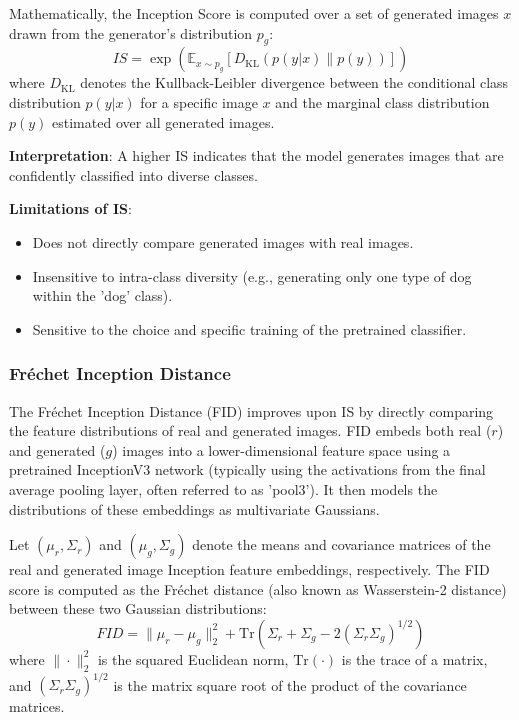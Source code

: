 \noindent
Mathematically, the Inception Score is computed over a set of generated images \(x\) drawn from the generator's distribution \(p_g\):
\begin{equation}
IS = \exp \left( \mathbb{E}_{x \sim p_g} \left[ D_{\text{KL}}(p(y|x) \| p(y)) \right] \right)
\end{equation}
where \( D_{\text{KL}} \) denotes the Kullback-Leibler divergence between the conditional class distribution \(p(y|x)\) for a specific image \(x\) and the marginal class distribution \(p(y)\) estimated over all generated images. 

\noindent\textbf{Interpretation}:
A higher IS indicates that the model generates images that are confidently classified into diverse classes.

\noindent\textbf{Limitations of IS}:
\begin{itemize}
    \item Does not directly compare generated images with real images.
    \item Insensitive to intra-class diversity (e.g., generating only one type of dog within the 'dog' class).
    \item Sensitive to the choice and specific training of the pretrained classifier.
\end{itemize}

\subsubsection[Fréchet Inception Distance - FID]{Fréchet Inception Distance}

The Fréchet Inception Distance (FID) \cite{heusel2018ganstrainedtimescaleupdate} improves upon IS by directly comparing the feature distributions of real and generated images. FID embeds both real (\(r\)) and generated (\(g\)) images into a lower-dimensional feature space using a pretrained InceptionV3 network (typically using the activations from the final average pooling layer, often referred to as 'pool3'). It then models the distributions of these embeddings as multivariate Gaussians.

Let \( (\mu_r, \Sigma_r) \) and \( (\mu_g, \Sigma_g) \) denote the means and covariance matrices of the real and generated image Inception feature embeddings, respectively. The FID score is computed as the Fréchet distance (also known as Wasserstein-2 distance) between these two Gaussian distributions:
\begin{equation}
FID = \| \mu_r - \mu_g \|^2_2 + \text{Tr} \left( \Sigma_r + \Sigma_g - 2(\Sigma_r \Sigma_g)^{1/2} \right)
\end{equation}
where \( \|\cdot\|^2_2 \) is the squared Euclidean norm, \( \text{Tr}(\cdot) \) is the trace of a matrix, and \( (\Sigma_r \Sigma_g)^{1/2} \) is the matrix square root of the product of the covariance matrices.

